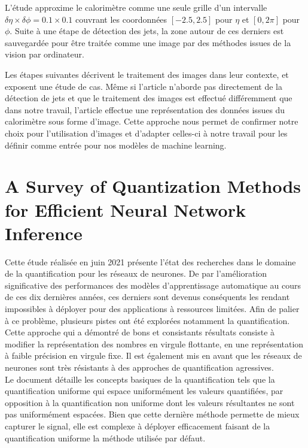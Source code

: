 L'étude approxime le calorimètre comme une seule grille d'un intervalle $\delta\eta \times \delta\phi = 0.1 \times 0.1$ couvrant les coordonnées $[-2.5, 2.5]$ pour $\eta$ et $[0, 2\pi]$ pour $\phi$. Suite à une étape de détection des jets, la zone autour de ces derniers est sauvegardée pour être traitée comme une image par des méthodes issues de la vision par ordinateur.

Les étapes suivantes décrivent le traitement des images dans leur contexte, et exposent une étude de cas. Même si l'article n'aborde pas directement de la détection de jets et que le traitement des images est effectué différemment que dans notre travail, l'article effectue une représentation des données issues du calorimètre sous forme d'image. Cette approche nous permet de confirmer notre choix pour l'utilisation d'images et d'adapter celles-ci à notre travail pour les définir comme entrée pour nos modèles de machine learning.

\section{A Survey of Quantization Methods for Efficient Neural Network Inference \cite{gholami_survey_2021}}

Cette étude réalisée en juin 2021 présente l'état des recherches dans le domaine de la quantification pour les réseaux de neurones. De par l'amélioration significative des performances des modèles d'apprentissage automatique au cours de ces dix dernières années, ces derniers sont devenus conséquents les rendant impossibles à déployer pour des applications à ressources limitées. Afin de palier à ce problème, plusieurs pistes ont été explorées notamment la quantification. Cette approche qui a démontré de bons et consistants résultats consiste à modifier la représentation des nombres en virgule flottante, en une représentation à faible précision en virgule fixe. Il est également mis en avant que les réseaux de neurones sont très résistants à des approches de quantification agressives.\\

Le document détaille les concepts basiques de la quantification tels que la quantification uniforme qui espace uniformément les valeurs quantifiées, par opposition à la quantification non uniforme dont les valeurs résultantes ne sont pas uniformément espacées. Bien que cette dernière méthode permette de mieux capturer le signal, elle est complexe à déployer efficacement faisant de la quantification uniforme la méthode utilisée par défaut.

